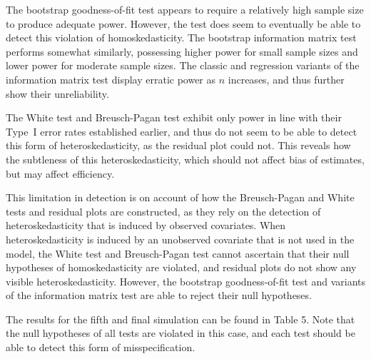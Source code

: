 \documentclass[sn-mathphys-ay]{sn-jnl}
\begin{document}
The bootstrap goodness-of-fit test appears to require a relatively high sample size to produce adequate power. However, the test does seem to eventually be able to detect this violation of homoskedasticity.
The bootstrap information matrix test performs somewhat similarly, possessing higher power for small sample sizes and lower power for moderate sample sizes. The classic and regression variants of the information
matrix test display erratic power as $n$ increases, and thus further show their unreliability.

The White test and Breusch-Pagan test exhibit only power in line with their Type~I error rates established earlier, and thus do not seem to be able to detect this form of heteroskedasticity,
as the residual plot could not. This reveals how the subtleness of this heteroskedasticity, which should not affect bias of estimates, but may affect efficiency.

This limitation in detection is on account of how the Breusch-Pagan and White tests and residual plots are constructed, as they rely on the detection of heteroskedasticity that is induced by observed covariates.
When heteroskedasticity is induced by an unobserved covariate that is not used in the model, the White test and Breusch-Pagan test cannot ascertain that their
null hypotheses of homoskedasticity are violated, and residual plots do not show any visible heteroskedasticity. However, the bootstrap goodness-of-fit test and variants of the information matrix test are able to
reject their null hypotheses.

The results for the fifth and final simulation can be found in Table 5. Note that the null hypotheses of all tests are violated in this case, and each test should be able to detect this form of misspecification.

\end{document}
